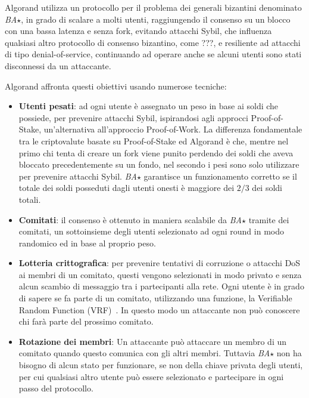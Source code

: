 Algorand utilizza un protocollo per il problema dei generali bizantini denominato \emph{BA$\star$}, in grado di scalare a molti utenti, raggiungendo il consenso su un blocco con una bassa latenza e senza fork, evitando attacchi Sybil, che influenza qualsiasi altro protocollo di consenso bizantino, come ???, e resiliente ad attacchi di tipo denial-of-service, continuando ad operare anche se alcuni utenti sono stati disconnessi da un attaccante.

Algorand affronta questi obiettivi usando numerose tecniche:
\begin{itemize}
	\item \textbf{Utenti pesati}: ad ogni utente è assegnato un peso in base ai soldi che possiede, per prevenire attacchi Sybil, ispirandosi agli approcci Proof-of-Stake, un'alternativa all'approccio Proof-of-Work. La differenza fondamentale tra le criptovalute basate su Proof-of-Stake ed Algorand è che, mentre nel primo chi tenta di creare un fork viene punito perdendo dei soldi che aveva bloccato precedentemente su un fondo, nel secondo i pesi sono solo utilizzare per prevenire attacchi Sybil. \emph{BA$\star$} garantisce un funzionamento corretto se il totale dei soldi posseduti dagli utenti onesti è maggiore dei $2/3$ dei soldi totali.
	\item \textbf{Comitati}: il consenso è ottenuto in maniera scalabile da \emph{BA$\star$} tramite dei comitati, un sottoinsieme degli utenti selezionato ad ogni round in modo randomico ed in base al proprio peso.
	\item \textbf{Lotteria crittografica}: per prevenire tentativi di corruzione o attacchi DoS ai membri di un comitato, questi vengono selezionati in modo privato e senza alcun scambio di messaggio tra i partecipanti alla rete. Ogni utente è in grado di sapere se fa parte di un comitato, utilizzando una funzione, la Verifiable Random Function (VRF)~\cite{micali1999verifiable}. In questo modo un attaccante non può conoscere chi farà parte del prossimo comitato.
	\item \textbf{Rotazione dei membri}: Un attaccante può attaccare un membro di un comitato quando questo comunica con gli altri membri. Tuttavia \emph{BA$\star$} non ha bisogno di alcun stato per funzionare, se non della chiave privata degli utenti, per cui qualsiasi altro utente può essere selezionato e partecipare in ogni passo del protocollo.
\end{itemize}


